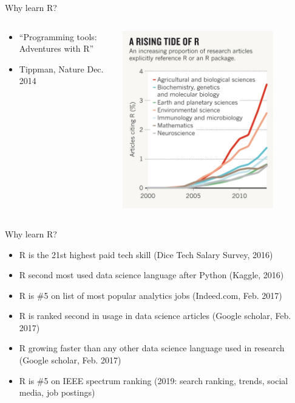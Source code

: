 \documentclass[aspectratio=169]{beamer}\usepackage[]{graphicx}\usepackage[]{color}
\begin{document}
\begin{frame}{Why learn R?}
\begin{columns}
  \begin{column}{0.5\textwidth}
    \begin{itemize}
      \item ``Programming tools: Adventures with R''
      \item Tippman, Nature Dec. 2014
    \end{itemize}
	\end{column}
	\begin{column}{0.5\textwidth}
		\begin{center}
			\includegraphics[width=0.8\textwidth]{./images/nature.jpg}
		\end{center}
	\end{column}
\end{columns}
\end{frame}

\begin{frame}{Why learn R?}
\begin{itemize}
  \item R is the 21st highest paid tech skill (Dice Tech Salary Survey, 2016)
  \item R second most used data science language after Python (Kaggle, 2016)
  \item R is \#5 on list of most popular analytics jobs  (Indeed.com, Feb. 2017)
  \item R is ranked second in usage in data science articles (Google scholar, Feb. 2017)
  \item R growing faster than any other data science language used in research (Google scholar, Feb. 2017)
  \item R is \#5 on IEEE spectrum ranking (2019: search ranking, trends, social media, job postings)
\end{itemize}
\end{frame}
\end{document}

